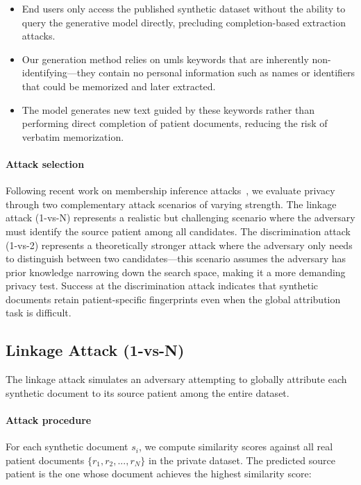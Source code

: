 \begin{itemize}
    \item End users only access the published synthetic dataset without the ability to query the generative model directly, precluding completion-based extraction attacks.
    \item Our generation method relies on \gls{umls} keywords that are inherently non-identifying—they contain no personal information such as names or identifiers that could be memorized and later extracted.
    \item The model generates new text guided by these keywords rather than performing direct completion of patient documents, reducing the risk of verbatim memorization.
\end{itemize}

\paragraph{Attack selection} Following recent work on membership inference attacks~\cite{mattern2023membership}, we evaluate privacy through two complementary attack scenarios of varying strength. The linkage attack (1-vs-N) represents a realistic but challenging scenario where the adversary must identify the source patient among all candidates. The discrimination attack (1-vs-2) represents a theoretically stronger attack where the adversary only needs to distinguish between two candidates—this scenario assumes the adversary has prior knowledge narrowing down the search space, making it a more demanding privacy test. Success at the discrimination attack indicates that synthetic documents retain patient-specific fingerprints even when the global attribution task is difficult.

\subsection{Linkage Attack (1-vs-N)}
\label{subsec:linkage_attack}

The linkage attack simulates an adversary attempting to globally attribute each synthetic document to its source patient among the entire dataset.

\paragraph{Attack procedure} For each synthetic document $s_i$, we compute similarity scores against all real patient documents $\{r_1, r_2, ..., r_N\}$ in the private dataset. The predicted source patient is the one whose document achieves the highest similarity score:

